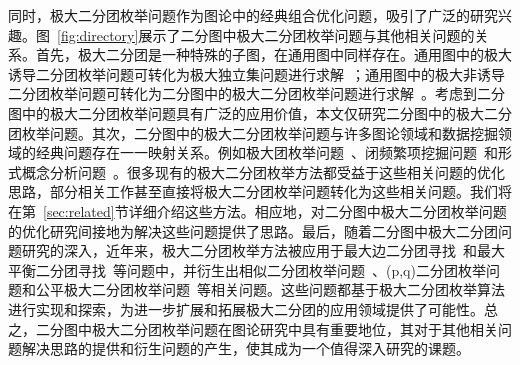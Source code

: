 同时，极大二分团枚举问题作为图论中的经典组合优化问题，吸引了广泛的研究兴趣。图~\ref{fig:directory}展示了二分图中极大二分团枚举问题与其他相关问题的关系。首先，极大二分团是一种特殊的子图，在通用图中同样存在。通用图中的极大诱导二分团枚举问题可转化为极大独立集问题进行求解~\cite{MBE-induced21}；通用图中的极大非诱导二分团枚举问题可转化为二分图中的极大二分团枚举问题进行求解~\cite{Proof09}。考虑到二分图中的极大二分团枚举问题具有广泛的应用价值，本文仅研究二分图中的极大二分团枚举问题。其次，二分图中的极大二分团枚举问题与许多图论领域和数据挖掘领域的经典问题存在一一映射关系。例如极大团枚举问题~\cite{MCE20,MCE-GPU21,MCE22}、闭频繁项挖掘问题~\cite{FCI98,FCI22}和形式概念分析问题~\cite{FCA21,FCA22}。很多现有的极大二分团枚举方法都受益于这些相关问题的优化思路，部分相关工作甚至直接将极大二分团枚举问题转化为这些相关问题。我们将在第~\ref{sec:related}节详细介绍这些方法。相应地，对二分图中极大二分团枚举问题的优化研究间接地为解决这些问题提供了思路。最后，随着二分图中极大二分团问题研究的深入，近年来，极大二分团枚举方法被应用于最大边二分团寻找~\cite{MEB20,MEB22}和最大平衡二分团寻找~\cite{MBB21}等问题中，并衍生出相似二分团枚举问题~\cite{SimilarMBE22}、(p,q)二分团枚举问题\cite{PQ21}和公平极大二分团枚举问题~\cite{FairMBE23}等相关问题。这些问题都基于极大二分团枚举算法进行实现和探索，为进一步扩展和拓展极大二分团的应用领域提供了可能性。总之，二分图中极大二分团枚举问题在图论研究中具有重要地位，其对于其他相关问题解决思路的提供和衍生问题的产生，使其成为一个值得深入研究的课题。



